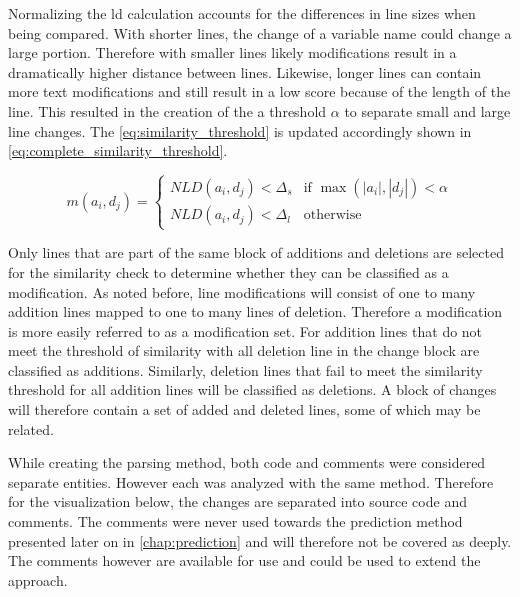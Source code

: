Normalizing the \gls{ld} calculation accounts for the differences in line sizes when being compared. With shorter lines, the change of a variable name could change a large portion. Therefore with smaller lines likely modifications result in a dramatically higher distance between lines. Likewise, longer lines can contain more text modifications and still result in a low score because of the length of the line. This resulted in the creation of the a threshold $\alpha$ to separate small and large line changes. The \autoref{eq:similarity_threshold} is updated accordingly shown in \autoref{eq:complete_similarity_threshold}.

\begin{equation}
\label{eq:complete_similarity_threshold}
m(a_i, d_j) = \left\{\begin{matrix}
NLD(a_i, d_j) < \Delta_s & \text{if } \max(|a_i|, |d_j|) < \alpha \\ 
NLD(a_i, d_j) < \Delta_l & \text{otherwise}
\end{matrix}\right.
\end{equation}

Only lines that are part of the same block of additions and deletions are selected for the similarity check to determine whether they can be classified as a modification. As noted before, line modifications will consist of one to many addition lines mapped to one to many lines of deletion. Therefore a modification is more easily referred to as a modification set. For addition lines that do not meet the threshold of similarity with all deletion line in the change block are classified as additions. Similarly, deletion lines that fail to meet the similarity threshold for all addition lines will be classified as deletions. A block of changes will therefore contain a set of added and deleted lines, some of which may be related.

While creating the parsing method, both code and comments were considered separate entities. However each was analyzed with the same method. Therefore for the visualization below, the changes are separated into source code and comments. The comments were never used towards the prediction method presented later on in \autoref{chap:prediction} and will therefore not be covered as deeply. The comments however are available for use and could be used to extend the approach.


